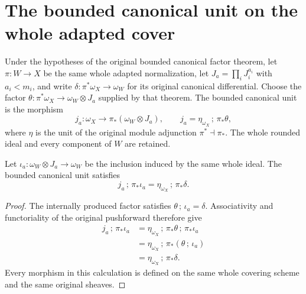 \section{The bounded canonical unit on the whole adapted cover}

\begin{definition}
\label{def:kn-nadel-bounded-canonical-pushforward-unit}
\leanok
Under the hypotheses of the original bounded canonical factor theorem,
let $\pi:W\to X$ be the same whole adapted normalization, let
$J_a=\prod_i J_i^{a_i}$ with $a_i<m_i$, and write
$\delta:\pi^*\omega_X\to\omega_W$ for its original canonical differential.
Choose the factor
$\theta:\pi^*\omega_X\to\omega_W\otimes J_a$ supplied by that theorem.
The bounded canonical unit is the morphism
\[
 j_a:\omega_X\longrightarrow\pi_*(\omega_W\otimes J_a),
 \qquad j_a=\eta_{\omega_X}\,;\,\pi_*\theta,
\]
where $\eta$ is the unit of the original module adjunction
$\pi^*\dashv\pi_*$. The whole rounded ideal and every component of $W$
are retained.
\end{definition}

\begin{lemma}
\label{lem:kn-nadel-bounded-canonical-pushforward-unit-factor}
\leanok
Let $\iota_a:\omega_W\otimes J_a\to\omega_W$ be the inclusion induced by
the same whole ideal. The bounded canonical unit satisfies
\[
 j_a\,;\,\pi_*\iota_a
   =\eta_{\omega_X}\,;\,\pi_*\delta.
\]
\end{lemma}
\begin{proof}
The internally produced factor satisfies $\theta\,;\,\iota_a=\delta$.
Associativity and functoriality of the original pushforward therefore give
\[
 \begin{aligned}
 j_a\,;\,\pi_*\iota_a
 &=\eta_{\omega_X}\,;\,\pi_*\theta\,;\,\pi_*\iota_a\\
 &=\eta_{\omega_X}\,;\,\pi_*(\theta\,;\,\iota_a)\\
 &=\eta_{\omega_X}\,;\,\pi_*\delta.
 \end{aligned}
\]
Every morphism in this calculation is defined on the same whole covering
scheme and the same original sheaves.
\end{proof}
